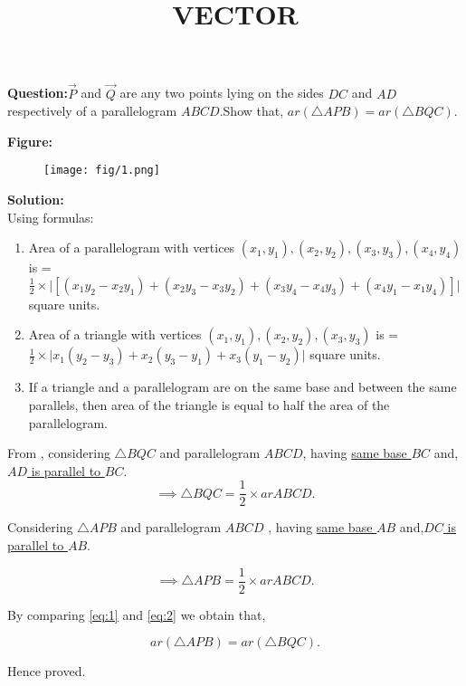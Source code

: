 \documentclass[12pt]{article}
\begin{document}
\title{\textbf{VECTOR}}
\date{}
\maketitle
\textbf{Question:}$\vec{P}$ and $\vec{Q}$ are any two points lying on the sides $DC$ and $AD$ respectively of a parallelogram $ABCD$.Show that, $ar(\triangle APB)=ar(\triangle BQC)$.


\textbf{Figure:}
\begin{figure}[H]
    \centering
	\texttt{[image: fig/1.png]}
    \caption{}
    \label{fig:fig:1}
\end{figure}


\textbf{Solution:}\\
Using formulas: \begin{enumerate}
\item Area of a parallelogram with  vertices $(x_1,y_1),(x_2,y_2),(x_3,y_3),(x_4,y_4)$ is =  $\frac{1}{2}\times \big |[(x_1y_2-x_2y_1)+(x_2y_3-x_3y_2)+(x_3y_4-x_4y_3)+(x_4y_1-x_1y_4)] \big|$ square units.
\item Area of a triangle with vertices $(x_1,y_1),(x_2,y_2),(x_3,y_3)$ is =  $\frac{1}{2}\times \big |x_1(y_2-y_3)+x_2(y_3-y_1)+x_3(y_1-y_2) \big|$ square units.

\item If a triangle and a parallelogram are on the same base and between the same parallels, then area of the triangle is equal to half the area of the parallelogram.

\end{enumerate}
From  ,
considering $\triangle BQC$ and parallelogram $ ABCD$, having \underline{same base $BC$} and, \underline{$AD$ is parallel to $BC$}.\\

\begin{equation}
\implies \triangle BQC = \frac{1}{2}\times ar ABCD.
 \label{eq:eq:1}
\end{equation}

Considering $\triangle APB$ and parallelogram $ABCD$ , having \underline{same base $AB$} and,\underline{$DC$ is parallel to $AB$}.

\begin{equation}
\implies \triangle APB = \frac{1}{2}\times ar ABCD.
 \label{eq:eq:2}
\end{equation}

By comparing \eqref{eq:1} and \eqref{eq:2} we obtain that,

\begin{equation}
    ar(\triangle APB) =  ar(\triangle BQC).
\end{equation}
\begin{center}
 Hence proved.

\end{center}
\end{document}
